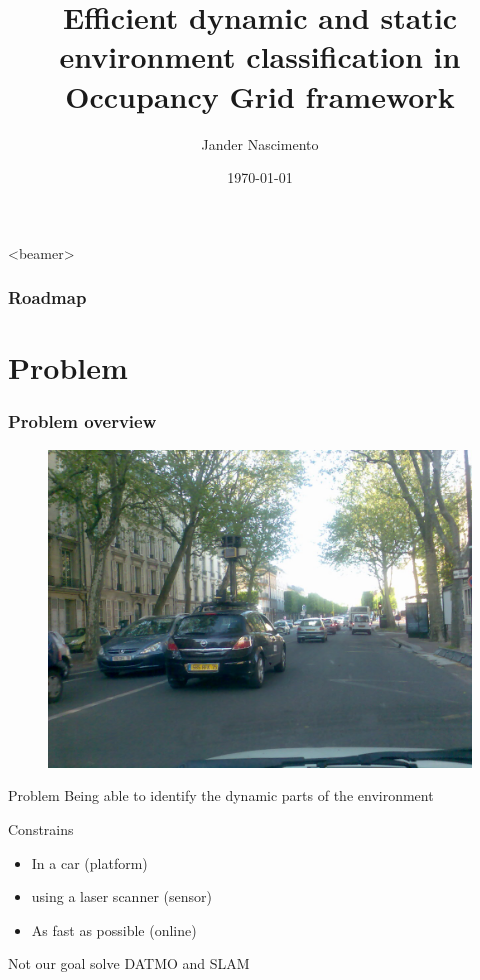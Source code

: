 \documentclass{beamer}
\title[Fast classification]{Efficient dynamic and static environment classification in Occupancy Grid framework}
\author{Jander Nascimento}
\institute{Université Joseph Fourier / INRIA}
\date{\today}
\begin{document}
\begin{frame}
\titlepage
\end{frame}

{
  \begin{frame}<beamer>
    \frametitle{Roadmap}
    \tableofcontents%
  \end{frame}
}

\section{Problem}

	\begin{frame}
		\frametitle{Problem overview}
		\begin{figure}[h]
			\center
			\includegraphics[scale=0.1]{img/fig:street:urban}
		 \end{figure}
		 
		\begin{block}{Problem}
			 Being able to identify the dynamic parts of the environment
		\end{block}
		 
		Constrains
		\begin{itemize}
			\item In a car (platform)
			\item using a laser scanner (sensor)
			\item As fast as possible (online)
		\end{itemize}

		\begin{alertblock}{Not our goal}
			solve DATMO and SLAM
		\end{alertblock}
	\end{frame}
\end{document}
